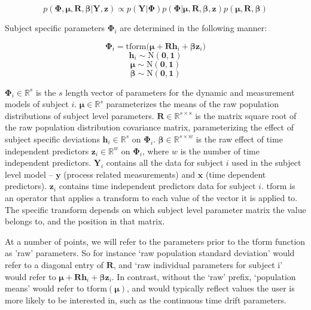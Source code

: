 \documentclass[11pt]{article}\usepackage[]{graphicx}\usepackage[]{color}
\newcommand{\vect}[1]{\boldsymbol{\mathbf{#1}}}
\begin{document}
\begin{equation}
p(\vect{\Phi},\vect{\mu},\vect{R},\vect{\beta} | \vect{Y}, \vect{z}) \propto p(\vect{Y} | \vect{\Phi}) p(\vect{\Phi} | \vect{\mu},\vect{R},\vect{\beta}, \vect{z}) p(\vect{\mu},\vect{R},\vect{\beta})
\end{equation}

Subject specific parameters $\vect{\Phi}_i$ are determined in the following manner:

\begin{equation}
\label{eq:subjectparams}
\vect{\Phi}_i = \text{tform} \bigg(\vect{\mu} + \vect{Rh}_i + \vect{\beta} \vect{z}_i \bigg)
\end{equation}  
\begin{equation}
\vect{h}_i \sim \mathrm{N}(\vect{0,1})
\end{equation}  
\begin{equation}
\vect{\mu} \sim \mathrm{N}(\vect{0,1})
\end{equation}  
\begin{equation}
\vect{\beta} \sim \mathrm{N}(\vect{0,1})
\end{equation}  

$\vect{\Phi}_i \in\mathbb{R}^{s}$ is the $s$ length vector of parameters for the dynamic and measurement models of subject $i$. 
$\vect{\mu} \in\mathbb{R}^{s}$ parameterizes the means of the raw population distributions of subject level parameters. 
$\vect{R} \in\mathbb{R}^{s \times s}$ is the matrix square root of the raw population distribution covariance matrix, parameterizing the effect of subject specific deviations $\vect{h}_i \in\mathbb{R}^{s}$ on $\vect{\Phi}_i$. 
$\vect{\beta} \in\mathbb{R}^{s \times w}$ is the raw effect of time independent predictors $\vect{z}_i \in\mathbb{R}^{w}$  on $\vect{\Phi}_i$, where $w$ is the number of time independent predictors. 
$\vect{Y}_i$ contains all the data for subject $i$ used in the subject level model -- $\vect{y}$ (process related measurements) and $\vect{x}$ (time dependent predictors).  $\vect{z}_i$ contains time independent predictors data for subject $i$. 
$\text{tform}$ is an operator that applies a transform to each value of the vector it is applied to. The specific transform depends on which subject level parameter matrix the value belongs to, and the position in that matrix. 

At a number of points, we will refer to the parameters prior to the tform function as 'raw' parameters. So for instance `raw population standard deviation' would refer to a diagonal entry of $\vect{R}$, and `raw individual parameters for subject i' would refer to $\vect{\mu} + \vect{Rh}_i + \vect{\beta} \vect{z}_i$. In contrast, without the `raw' prefix, `population means' would refer to $\text{tform} (\vect{\mu})$, and would typically reflect values the user is more likely to be interested in, such as the continuous time drift parameters.
\end{document}
